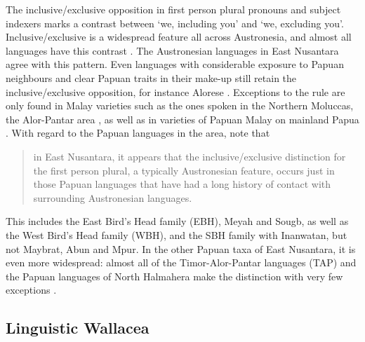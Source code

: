 The inclusive/exclusive opposition in first person plural pronouns and subject indexers marks a contrast between `we, including you' and `we, excluding you'. Inclusive/exclusive is a widespread feature all across Austronesia, and almost all languages have this contrast \citep{Tryon1995,klamer2008east}. The Austronesian languages in East Nusantara agree with this pattern. Even languages with considerable exposure to Papuan neighbours and clear Papuan traits in their make-up still retain the inclusive/exclusive opposition, for instance Alorese \citep{klamer2011alorese}. Exceptions to the rule are only found in Malay varieties such as the ones spoken in the Northern Moluccas, the Alor-Pantar area \citep{klamer2008east}, as well as in varieties of Papuan Malay on mainland Papua \citep{kluge2014grammar}. With regard to the Papuan languages in the area, \citet[115]{klamer2008east} note that \begin{quote}in East Nusantara, it appears that the inclusive/exclusive distinction for the first person plural, a typically Austronesian feature,
occurs just in those Papuan languages that have had a long history of contact with surrounding Austronesian languages.\end{quote}
This includes the East Bird's Head family (EBH), Meyah and Sougb, as well as the West Bird's Head family (WBH), and the SBH family with Inanwatan, but not Maybrat, Abun and Mpur. In the other Papuan taxa of East Nusantara, it is even more widespread: almost all of the Timor-Alor-Pantar languages (TAP) and the Papuan languages of North Halmahera make the distinction with very few exceptions \citep[115]{klamer2008east}. 

\subsection{Linguistic Wallacea}\label{sec:wallacea}

